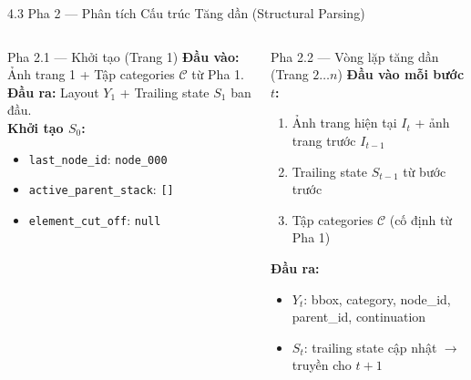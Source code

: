 \documentclass[aspectratio=1610,8pt]{beamer}
\begin{document}
\begin{frame}{4.3 \; Pha 2 — Phân tích Cấu trúc Tăng dần (Structural Parsing)}
    \begin{columns}[T]
        \begin{block}{Pha 2.1 — Khởi tạo (Trang 1)}
            \textbf{Đầu vào:} Ảnh trang 1 + Tập categories $\mathcal{C}$ từ Pha 1.\\[0.3em]
            \textbf{Đầu ra:} Layout $Y_1$ + Trailing state $S_1$ ban đầu.\\[0.3em]
            \textbf{Khởi tạo $S_0$:}
            \begin{itemize}
                \item \texttt{last\_node\_id}: \texttt{node\_000}
                \item \texttt{active\_parent\_stack}: \texttt{[]}
                \item \texttt{element\_cut\_off}: \texttt{null}
            \end{itemize}
        \end{block}

        \begin{block}{Pha 2.2 — Vòng lặp tăng dần (Trang $2 \ldots n$)}
            \textbf{Đầu vào mỗi bước $t$:}
            \begin{enumerate}
                \item Ảnh trang hiện tại $I_t$ + ảnh trang trước $I_{t-1}$
                \item Trailing state $S_{t-1}$ từ bước trước
                \item Tập categories $\mathcal{C}$ (cố định từ Pha 1)
            \end{enumerate}
            \textbf{Đầu ra:}
            \begin{itemize}
                \item $Y_t$: bbox, category, node\_id, parent\_id, continuation
                \item $S_t$: trailing state cập nhật $\rightarrow$ truyền cho $t{+}1$
            \end{itemize}
        \end{block}
    \end{columns}


\end{frame}
\end{document}
